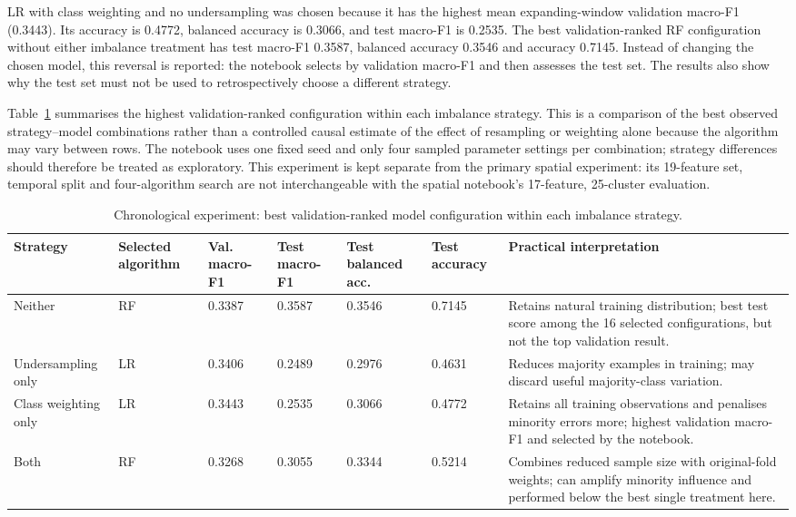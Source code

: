 \documentclass[conference]{IEEEtran}
\begin{document}
LR with class weighting and no undersampling was chosen because it has the highest mean expanding-window validation macro-F1 (0.3443). Its accuracy is 0.4772, balanced accuracy is 0.3066, and test macro-F1 is 0.2535. The best validation-ranked RF configuration without either imbalance treatment has test macro-F1 0.3587, balanced accuracy 0.3546 and accuracy 0.7145. Instead of changing the chosen model, this reversal is reported: the notebook selects by validation macro-F1 and then assesses the test set. The results also show why the test set must not be used to retrospectively choose a different strategy.

Table~\ref{tab:imbalance} summarises the highest validation-ranked configuration within each imbalance strategy. This is a comparison of the best observed strategy--model combinations rather than a controlled causal estimate of the effect of resampling or weighting alone because the algorithm may vary between rows. The notebook uses one fixed seed and only four sampled parameter settings per combination; strategy differences should therefore be treated as exploratory. This experiment is kept separate from the primary spatial experiment: its 19-feature set, temporal split and four-algorithm search are not interchangeable with the spatial notebook's 17-feature, 25-cluster evaluation.

\begin{table}[t]
\caption{Chronological experiment: best validation-ranked model configuration within each imbalance strategy.}
\label{tab:imbalance}
\centering\scriptsize
\setlength{\tabcolsep}{2pt}
\begin{tabular}{p{}p{}p{}p{}p{}p{}p{}}
\toprule
Strategy & Selected algorithm & Val. macro-F1 & Test macro-F1 & Test balanced acc. & Test accuracy & Practical interpretation\\
\midrule
Neither & RF & 0.3387 & 0.3587 & 0.3546 & 0.7145 & Retains natural training distribution; best test score among the 16 selected configurations, but not the top validation result.\\
Undersampling only & LR & 0.3406 & 0.2489 & 0.2976 & 0.4631 & Reduces majority examples in training; may discard useful majority-class variation.\\
Class weighting only & LR & 0.3443 & 0.2535 & 0.3066 & 0.4772 & Retains all training observations and penalises minority errors more; highest validation macro-F1 and selected by the notebook.\\
Both & RF & 0.3268 & 0.3055 & 0.3344 & 0.5214 & Combines reduced sample size with original-fold weights; can amplify minority influence and performed below the best single treatment here.\\
\bottomrule
\end{tabular}
\end{table}
\end{document}
